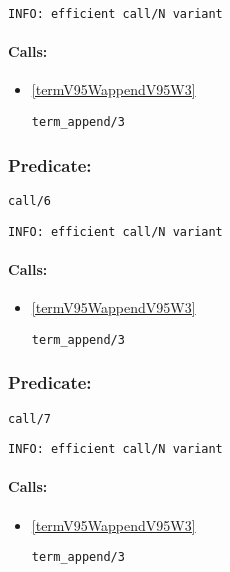{\small \begin{verbatim}
INFO: efficient call/N variant

\end{verbatim}}
\paragraph{Calls:} 
\begin{itemize}
\item \ref{termV95WappendV95W3} 
\begin{verbatim}
term_append/3
\end{verbatim}

\end{itemize}

\subsubsection{Predicate:} \label{callV95W6}

\begin{verbatim}
call/6
\end{verbatim}

{\small \begin{verbatim}
INFO: efficient call/N variant

\end{verbatim}}
\paragraph{Calls:} 
\begin{itemize}
\item \ref{termV95WappendV95W3} 
\begin{verbatim}
term_append/3
\end{verbatim}

\end{itemize}

\subsubsection{Predicate:} \label{callV95W7}

\begin{verbatim}
call/7
\end{verbatim}

{\small \begin{verbatim}
INFO: efficient call/N variant

\end{verbatim}}
\paragraph{Calls:} 
\begin{itemize}
\item \ref{termV95WappendV95W3} 
\begin{verbatim}
term_append/3
\end{verbatim}

\end{itemize}

